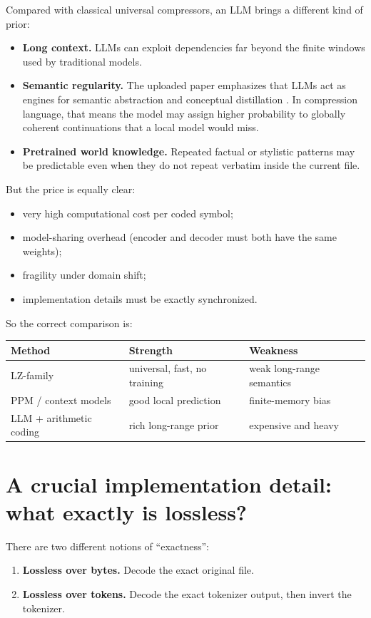\documentclass[11pt]{article}
\theoremstyle{remark}
\begin{document}
Compared with classical universal compressors, an LLM brings a different kind of prior:
\begin{itemize}
    \item \textbf{Long context.} LLMs can exploit dependencies far beyond the finite windows used by traditional models.
    \item \textbf{Semantic regularity.} The uploaded paper emphasizes that LLMs act as engines for semantic abstraction and conceptual distillation \cite{li2026}. In compression language, that means the model may assign higher probability to globally coherent continuations that a local model would miss.
    \item \textbf{Pretrained world knowledge.} Repeated factual or stylistic patterns may be predictable even when they do not repeat verbatim inside the current file.
\end{itemize}

But the price is equally clear:
\begin{itemize}
    \item very high computational cost per coded symbol;
    \item model-sharing overhead (encoder and decoder must both have the same weights);
    \item fragility under domain shift;
    \item implementation details must be exactly synchronized.
\end{itemize}

So the correct comparison is:
\begin{center}
\begin{tabular}{@{}lll@{}}
\toprule
Method & Strength & Weakness \\
\midrule
LZ-family & universal, fast, no training & weak long-range semantics \\
PPM / context models & good local prediction & finite-memory bias \\
LLM + arithmetic coding & rich long-range prior & expensive and heavy \\
\bottomrule
\end{tabular}
\end{center}

\section{A crucial implementation detail: what exactly is lossless?}

There are two different notions of ``exactness'':
\begin{enumerate}
    \item \textbf{Lossless over bytes.} Decode the exact original file.
    \item \textbf{Lossless over tokens.} Decode the exact tokenizer output, then invert the tokenizer.
\end{enumerate}
\end{document}
